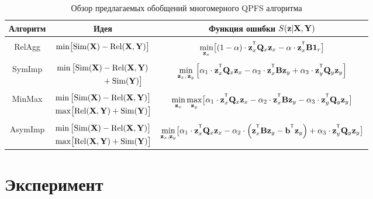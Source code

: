 \begin{table}[ht]
	\centering
	\caption{Обзор предлагаемых обобщений многомерного QPFS алгоритма}
	\small{
		\begin{tabular}{c|c|c}
			\hline
			Алгоритм & Идея & Функция ошибки $S(\mathbf{z} | \mathbf{X}, \mathbf{Y})$ \\
			\hline && \\ [-.5em]
			RelAgg & $\min \bigl[ \text{Sim}(\mathbf{X}) - \text{Rel}(\mathbf{X}, \mathbf{Y}) \bigr] $ & $\min\limits_{\bz_x} \bigl[ (1 - \alpha) \cdot \bz_x^{\T} \bQ_x \bz_x - \alpha \cdot \bz_x^{\T} \bB \bOne_r \bigr] $ \\ &&\\[-.5em]
			SymImp & $\begin{aligned} \min \, \bigl[ \text{Sim}(\mathbf{X}) & - \text{Rel}(\mathbf{X}, \mathbf{Y}) \\ & + \text{Sim}(\mathbf{Y}) \bigr] \end{aligned}$ & $ \min\limits_{\bz_x, \, \bz_y} \left[ \alpha_1 \cdot \bz_x^{\T} \bQ_x \bz_x - \alpha_2 \cdot \bz_x^{\T} \bB \bz_y + \alpha_3 \cdot \bz_y^{\T} \bQ_y \bz_y \right] $\\ &&\\ [-.5em]
			MinMax & $\begin{aligned} &\min \, \bigl[ \text{Sim}(\mathbf{X}) - \text{Rel}(\mathbf{X}, \mathbf{Y}) \bigr]  \\ & \max \bigl[\text{Rel}(\mathbf{X}, \mathbf{Y}) + \text{Sim}(\mathbf{Y}) \bigr] \end{aligned}$ & $	\min\limits_{\bz_x} 	\max\limits_{\bz_y} \bigl[\alpha_1 \cdot \bz_x^{\T} \bQ_x \bz_x - \alpha_2 \cdot \bz_x^{\T} \bB \bz_y - \alpha_3 \cdot \bz_y^{\T} \bQ_y \bz_y \bigr]$ \\ &&\\ [-.5em]
			AsymImp & $\begin{aligned} & \min \, \bigl[ \text{Sim}(\mathbf{X}) - \text{Rel}(\mathbf{X}, \mathbf{Y}) \bigr]\\ &  \max \bigl[\text{Rel}(\mathbf{X}, \mathbf{Y}) + \text{Sim}(\mathbf{Y}) \bigr] \end{aligned}$ & $\min\limits_{\bz_x, \bz_y} \bigl[ \alpha_1 \cdot \bz_x^{\T} \bQ_x \bz_x - \alpha_2 \cdot \left(\bz_x^{\T} \bB \bz_y - \bb^{\T} \bz_y \right) + \alpha_3 \cdot \bz_y^{\T} \bQ_y \bz_y \bigr]$\\ 
			\hline
	\end{tabular}}
	\label{tbl:summary}
\end{table}


\section{Эксперимент}

